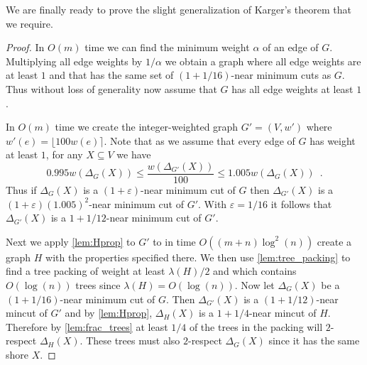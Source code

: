\documentclass[10pt,a4paper]{article}
\newcommand{\1}{\mathbf{1}}
\theoremstyle{definition}
\begin{document}
We are finally ready to prove the slight generalization of Karger's theorem that we require.
\kargerthm*

\begin{proof}
In $O(m)$ time we can find the minimum weight $\alpha$ of an edge of $G$.  Multiplying all edge weights by $1/\alpha$ we obtain a graph where all edge weights are at least $1$ and that has the same 
set of $(1+1/16)$-near minimum cuts as $G$.  Thus without loss of generality now assume that $G$ has all edge weights at least $1$.  

In $O(m)$ time we create the integer-weighted graph $G' = (V,w')$ where $w'(e) = \lfloor 100w(e) \rceil$.  Note that as we assume that every edge of $G$ has weight at least $1$, for any 
$X \subseteq V$ we have
\begin{equation}
\label{eq:int_approx}
0.995 w(\Delta_G(X)) \le \frac{ w(\Delta_{G'}(X))}{100} \le 1.005 w(\Delta_G(X)) \enspace .
\end{equation}
Thus if $\Delta_G(X)$ is a $(1+ \varepsilon)$-near minimum cut of $G$ then $\Delta_{G'}(X)$ is a $(1+\varepsilon)(1.005)^2$-near minimum cut of $G'$.  With $\varepsilon = 1/16$ 
it follows that $\Delta_{G'}(X)$ is a $1+1/12$-near minimum cut of $G'$.

Next we apply \cref{lem:Hprop} to $G'$ to in time $O((m + n) \log^2(n))$ create a graph $H$ with the properties specified there.  We then use \cref{lem:tree_packing} to find a tree packing 
of weight at least $\lambda(H)/2$ and which contains $O(\log(n))$ trees since $\lambda(H) = O(\log(n))$.  Now let $\Delta_G(X)$ be a $(1+1/16)$-near minimum cut of $G$. 
Then $\Delta_{G'}(X)$ is a $(1+1/12)$-near mincut of $G'$ and by \cref{lem:Hprop}, $\Delta_H(X)$ is a $1+1/4$-near mincut of $H$.  
Therefore by \cref{lem:frac_trees} at least $1/4$ of the trees in the packing will $2$-respect $\Delta_H(X)$.  
These trees must also $2$-respect $\Delta_G(X)$ since it has the same shore $X$.
\end{proof}
\end{document}
